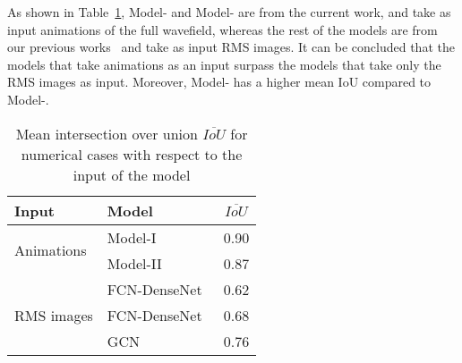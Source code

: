 As shown in Table~\ref{tab:meanIoU_vs_input}, Model- and Model- are from the current work, and take as input animations of the full wavefield, whereas the rest of the models are from our previous works~\cite{Ijjeh2021, Ijjeh2022} and take as input RMS images.
It can be concluded that the models that take animations as an input surpass the models that take only the RMS images as input. 
Moreover, Model- has a higher mean IoU compared to Model-.
\begin{table}[]
	\centering
	\caption{Mean intersection over union \(\overline{IoU}\) for numerical cases with respect to the input of the model}
	\begin{tabular}{llc}
		\toprule
		Input & Model & \(\overline{IoU}\) \\ 
		\midrule
		\multirow{2}{*}{Animations} & Model-I & 0.90 \\ & Model-II                    & 0.87     \\ \midrule
		\multirow{3}{*}{RMS images}  & FCN-DenseNet~\cite{Ijjeh2021} & 0.62     \\
		& FCN-DenseNet~\cite{Ijjeh2022} & 0.68     \\
		& GCN~\cite{Ijjeh2022}          & 0.76     \\ 
		\bottomrule
	\end{tabular}
	\label{tab:meanIoU_vs_input}
\end{table}
